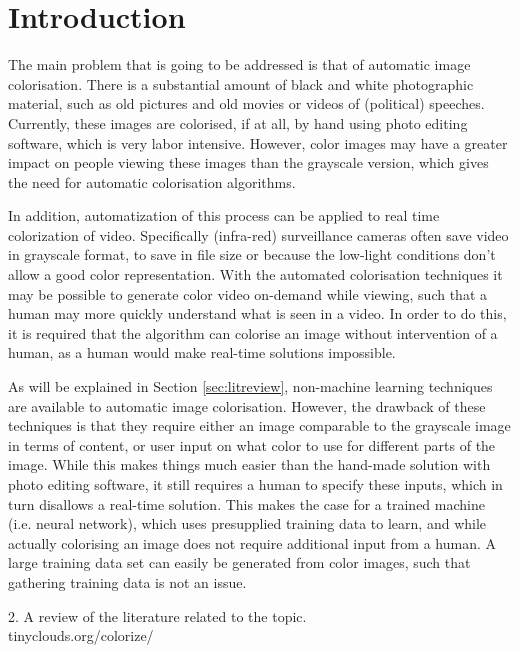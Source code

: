 \section{Introduction}
The main problem that is going to be addressed is that of automatic image colorisation. There is a substantial amount of black and white photographic material, such as old pictures and old movies or videos of (political) speeches. Currently, these images are colorised, if at all, by hand using photo editing software, which is very labor intensive. However, color images may have a greater impact on people viewing these images than the grayscale version, which gives the need for automatic colorisation algorithms.

In addition, automatization of this process can be applied to real time colorization of video. Specifically (infra-red) surveillance cameras often save video in grayscale format, to save in file size or because the low-light conditions don't allow a good color representation. With the automated colorisation techniques it may be possible to generate color video on-demand while viewing, such that a human may more quickly understand what is seen in a video. In order to do this, it is required that the algorithm can colorise an image without intervention of a human, as a human would make real-time solutions impossible.

As will be explained in Section \ref{sec:litreview}, non-machine learning techniques are available to automatic image colorisation. However, the drawback of these techniques is that they require either an image comparable to the grayscale image in terms of content, or user input on what color to use for different parts of the image. While this makes things much easier than the hand-made solution with photo editing software, it still requires a human to specify these inputs, which in turn disallows a real-time solution. This makes the case for a trained machine (i.e. neural network), which uses presupplied training data to learn, and while actually colorising an image does not require additional input from a human. A large training data set can easily be generated from color images, such that gathering training data is not an issue.

2. A review of the literature related to the topic.\\
tinyclouds.org/colorize/\\



